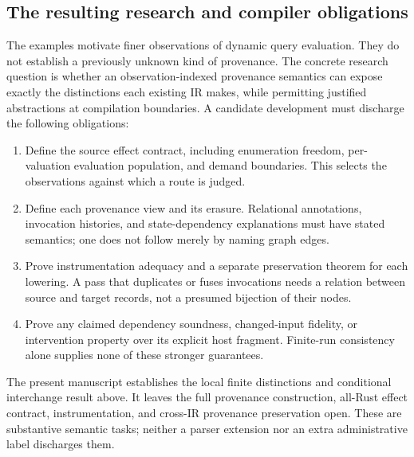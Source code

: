 \subsection{The resulting research and compiler obligations}
The examples motivate finer observations of dynamic query evaluation. They do
not establish a previously unknown kind of provenance. The concrete research
question is whether an observation-indexed provenance semantics can expose
exactly the distinctions each existing IR makes, while permitting justified
abstractions at compilation boundaries. A candidate development must discharge
the following obligations:
\begin{enumerate}
\item Define the source effect contract, including enumeration freedom,
per-valuation evaluation population, and demand boundaries. This selects the
observations against which a route is judged.
\item Define each provenance view and its erasure. Relational annotations,
invocation histories, and state-dependency explanations must have stated
semantics; one does not follow merely by naming graph edges.
\item Prove instrumentation adequacy and a separate preservation theorem for
each lowering. A pass that duplicates or fuses invocations needs a relation
between source and target records, not a presumed bijection of their nodes.
\item Prove any claimed dependency soundness, changed-input fidelity, or
intervention property over its explicit host fragment. Finite-run consistency
alone supplies none of these stronger guarantees.
\end{enumerate}
The present manuscript establishes the local finite distinctions and conditional
interchange result above. It leaves the full provenance construction,
all-Rust effect contract, instrumentation, and cross-IR provenance preservation
open. These are substantive semantic tasks; neither a parser extension nor an
extra administrative label discharges them.

